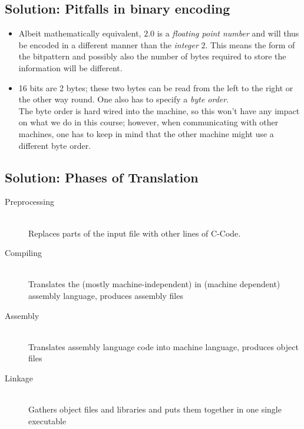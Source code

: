 \subsection*{Solution: Pitfalls in binary encoding}
\begin{itemize}
\item Albeit mathematically equivalent, $2.0$ is a \emph{floating point number} and will thus be encoded in a different manner than the \emph{integer} $2$.
	This means the form of the bitpattern and possibly also the number of bytes required to store the information will be different.
\item 16 bits are 2 bytes; these two bytes can be read from the left to the right or the other way round. One also has to specify a \emph{byte order}.\\
	The byte order is hard wired into the machine, so this won't have any impact on what we do in this course; however, when communicating with other machines,
	one has to keep in mind that the other machine might use a different byte order.
\end{itemize}

\subsection*{Solution: Phases of Translation}
\begin{description}
\item[Preprocessing] \hfill \\
	Replaces parts of the input file with other lines of C-Code.
\item[Compiling]     \hfill \\
	Translates the (mostly machine-independent) in (machine dependent) assembly language, produces assembly files
\item[Assembly]      \hfill \\
	Translates assembly language code into machine language, produces object files
\item[Linkage]       \hfill \\
	Gathers object files and libraries and puts them together in one single executable
\end{description}

